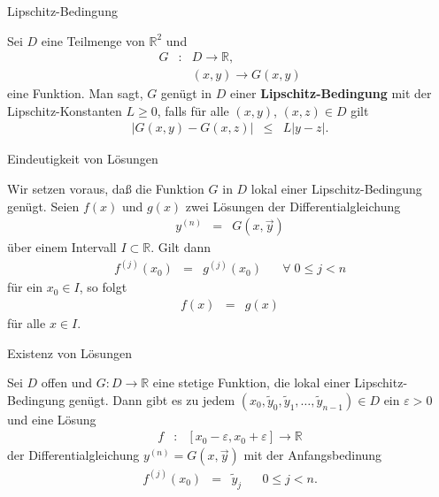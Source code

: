\documentclass[german]{beamer}
\newcommand{\bq}{\begin{eqnarray*}}
\newcommand{\eq}{\end{eqnarray*}}
\newcommand{\eps}{\varepsilon}
\begin{document}
\begin{frame}{Lipschitz-Bedingung}

\begin{definition}
Sei $D$ eine Teilmenge von ${\mathbb R}^2$ und 
\bq
 G & : & D \rightarrow {\mathbb R},
 \nonumber \\
 & & \left(x,y\right) \rightarrow G\left(x,y\right)
\eq
eine Funktion.
Man sagt, $G$ gen\"ugt in $D$ einer {\bf Lipschitz-Bedingung} mit der
Lipschitz-Konstanten $L \ge 0$, falls f\"ur alle $(x,y)$, $(x,z) \in D$ gilt
\bq
 \left| G\left(x,y\right) - G\left(x,z\right) \right|
 & \le &
 L \left| y - z \right|.
\eq
\end{definition}

\end{frame}

\begin{frame}{Eindeutigkeit von L\"osungen}

\begin{theorem}
Wir setzen voraus, da{\ss} die Funktion
$G$ in $D$ lokal einer Lipschitz-Bedingung gen\"ugt.
Seien $f(x)$ und $g(x)$ zwei L\"osungen der Differentialgleichung
\bq
 y^{(n)} & = & G\left(x,\vec{y}\right)
\eq
\"uber einem Intervall $I \subset {\mathbb R}$. Gilt dann
\bq
 f^{(j)}\left(x_0\right) & = & g^{(j)}\left(x_0\right) 
 \;\;\;\;\;\; \forall \; 0 \le j < n 
\eq
f\"ur ein $x_0 \in I$, so folgt
\bq
 f\left(x\right) & = & g\left(x\right) 
\eq
f\"ur alle $x\in I$.
\end{theorem}

\end{frame}

\begin{frame}{Existenz von L\"osungen}

\begin{theorem}
Sei $D$ offen und $G : D \rightarrow {\mathbb R}$ eine stetige Funktion, die lokal
einer Lipschitz-Bedingung gen\"ugt.
Dann gibt es zu jedem $\left(x_0,\tilde{y}_0,\tilde{y}_1,\dots,\tilde{y}_{n-1}\right) \in D$ ein $\eps > 0$ und eine L\"osung
\bq
 f & : & \left[x_0-\eps, x_0+\eps \right] \rightarrow {\mathbb R}
\eq
der Differentialgleichung $y^{(n)} = G\left(x,\vec{y}\right)$
mit der Anfangsbedinung
\bq
 f^{(j)}(x_0) & = & \tilde{y}_j
 \;\;\;\;\;\;
 0 \le j < n.
\eq
\end{theorem}

\end{frame}
\end{document}
